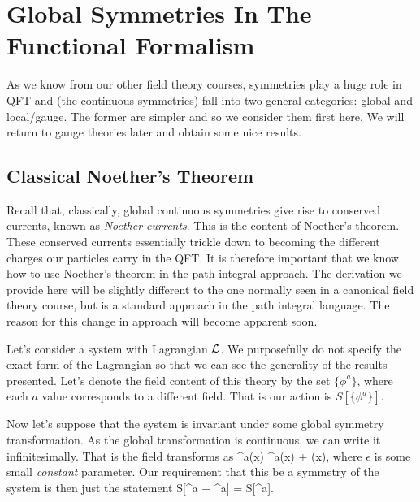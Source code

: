 \chapter{Global Symmetries In The Functional Formalism}


As we know from our other field theory courses, symmetries play a huge role in QFT and (the continuous symmetries) fall into two general categories: global and local/gauge. The former are simpler and so we consider them first here. We will return to gauge theories later and obtain some nice results. 

\section{Classical Noether's Theorem}

Recall that, classically, global continuous symmetries give rise to conserved currents, known as \textit{Noether currents}. This is the content of Noether's theorem. These conserved currents essentially trickle down to becoming the different charges our particles carry in the QFT. It is therefore important that we know how to use Noether's theorem in the path integral approach. The derivation we provide here will be slightly different to the one normally seen in a canonical field theory course, but is a standard approach in the path integral language. The reason for this change in approach will become apparent soon. 

Let's consider a system with Lagrangian $\mathcal{L}$. We purposefully do not specify the exact form of the Lagrangian so that we can see the generality of the results presented. Let's denote the field content of this theory by the set $\{\phi^a\}$, where each $a$ value corresponds to a different field. That is our action is $S[\{\phi^a\}]$.

Now let's suppose that the system is invariant under some global symmetry transformation. As the global transformation is continuous, we can write it infinitesimally. That is the field transforms as 
\be
\label{eqn:GlobalFieldTransformation}
    \phi^a(x) \to \phi^a(x) + \epsilon \del \phi(x),
\ee 
where $\epsilon$ is some small \textit{constant} parameter. Our requirement that this be a symmetry of the system is then just the statement
\bse 
    S[\phi^a + \epsilon \del\phi^a] = S[\phi^a].
\ese 

